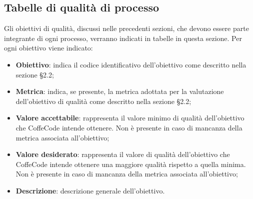 \documentclass[../piano-di-qualifica.tex]{subfiles}
\begin{document}
\subsection{Tabelle di qualità di processo}
\label{sub:tabelle_di_qualita_di_processo}
Gli obiettivi di qualità, discussi nelle precedenti sezioni, che devono essere parte integrante di ogni processo, verranno indicati in tabelle in questa sezione.
Per ogni obiettivo viene indicato:

\begin{itemize}
   \item \textbf{Obiettivo}: indica il codice identificativo dell'obiettivo come descritto nella sezione §2.2;
   \item \textbf{Metrica}: indica, se presente, la metrica adottata per la valutazione dell'obiettivo di qualità come descritto nella sezione §2.2;
   \item \textbf{Valore accettabile}: rappresenta il valore minimo di qualità dell'obiettivo che CoffeCode intende ottenere. Non è presente in caso di mancanza della metrica associata all'obiettivo;
   \item \textbf{Valore desiderato}: rappresenta il valore di qualità dell'obiettivo che CoffeCode intende ottenere una maggiore qualità rispetto a quella minima. Non è presente in caso di mancanza della metrica associata all'obiettivo;
   \item \textbf{Descrizione}: descrizione generale dell'obiettivo.
\end{itemize}
\end{document}
